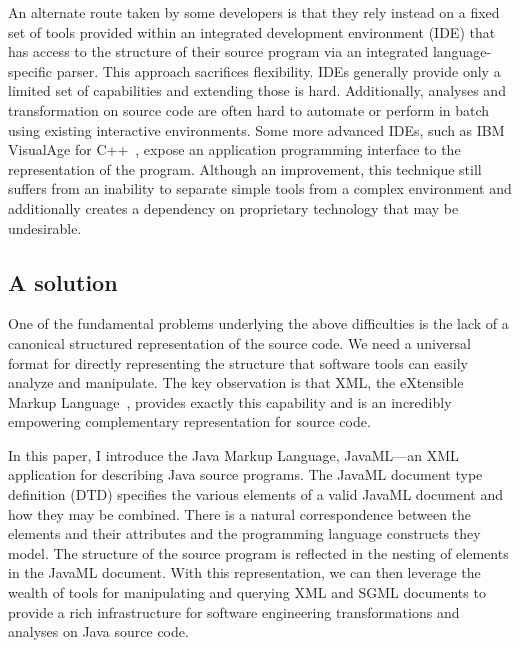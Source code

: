 \documentclass{article}
\begin{document}
\begin{multicols}{2}
An alternate route taken by some developers is that they rely instead on
a fixed set of tools provided within an integrated development
environment (IDE) that has access to the structure of their source
program via an integrated language-specific parser.  This approach
sacrifices flexibility.  IDEs generally provide only a limited set of
capabilities and extending those is hard.  Additionally, analyses and
transformation on source code are often hard to automate or perform in
batch using existing interactive environments.  Some more advanced IDEs,
such as IBM VisualAge for C++~\cite{Soroker97}, expose an application
programming interface to the representation of the program.  Although an
improvement, this technique still suffers from an inability to separate
simple tools from a complex environment and additionally creates a
dependency on proprietary technology that may be undesirable.

\subsection{A solution}

One of the fundamental problems underlying the above difficulties is the
lack of a canonical structured representation of the source code.  We
need a universal format for directly representing the structure that
software tools can easily analyze and manipulate.  The key observation
is that XML, the eXtensible Markup Language~\cite{XML}, provides exactly
this capability and is an incredibly empowering complementary
representation for source code.

In this paper, I introduce the Java Markup Language, JavaML---an XML
application for describing Java source programs.  The JavaML document
type definition (DTD) specifies the various elements of a valid JavaML
document and how they may be combined.  There is a natural
correspondence between the elements and their attributes and the
programming language constructs they model.  The structure of the source
program is reflected in the nesting of elements in the JavaML document.
With this representation, we can then leverage the wealth of tools for
manipulating and querying XML and SGML documents to provide a rich
infrastructure for software engineering transformations and analyses on
Java source code.


\end{multicols}
\end{document}
